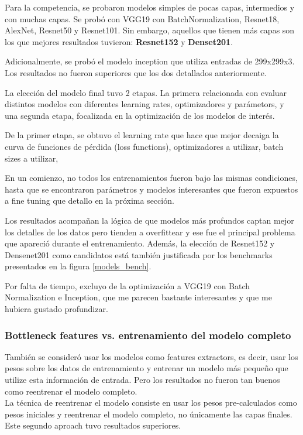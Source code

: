 \documentclass{article}
\begin{document}
Para la competencia, se probaron modelos simples de pocas capas, intermedios y con muchas capas. Se probó con VGG19 con BatchNormalization, Resnet18, AlexNet, Resnet50 y Resnet101. Sin embargo, aquellos que tienen más capas son los que mejores resultados tuvieron: \textbf{Resnet152} y \textbf{Denset201}. 

Adicionalmente, se probó el modelo inception que utiliza entradas de 299x299x3. Los resultados no fueron superiores que los dos detallados anteriormente.

La elección del modelo final tuvo 2 etapas. La primera relacionada con evaluar distintos modelos con diferentes learning rates, optimizadores y parámetors, y una segunda etapa, focalizada en la optimización de los modelos de interés.

De la primer etapa, se obtuvo el learning rate que hace que mejor decaiga la curva de funciones de pérdida (loss functions), optimizadores a utilizar, batch sizes a utilizar, 
 
En un comienzo, no todos los entrenamientos fueron bajo las mismas condiciones, hasta que se encontraron parámetros y modelos interesantes que fueron expuestos a fine tuning que detallo en la próxima sección.

Los resultados acompañan la lógica de que modelos más profundos captan mejor los detalles de los datos pero tienden a overfittear y ese fue el principal problema que apareció durante el entrenamiento. Además, la elección de Resnet152 y Densenet201 como candidatos está también justificada por los benchmarks presentados en la figura \ref{models_bench}.

Por falta de tiempo, excluyo de la optimización a VGG19 con Batch Normalization e Inception, que me parecen bastante interesantes y que me hubiera gustado profundizar. 

\subsubsection{Bottleneck features vs. entrenamiento del modelo completo}

También se consideró usar los modelos como features extractors, es decir, usar los pesos sobre los datos de entrenamiento y entrenar un modelo más pequeño que utilize esta información de entrada. Pero los resultados no fueron tan buenos como reentrenar el modelo completo.\\

La técnica de reentrenar el modelo consiste en usar los pesos pre-calculados como pesos iniciales y reentrenar el modelo completo, no únicamente las capas finales. Este segundo aproach tuvo resultados superiores.
\end{document}
